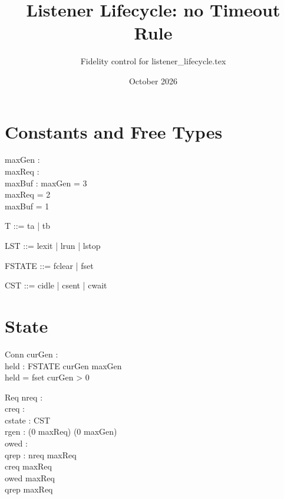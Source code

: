 \documentclass[a4paper,10pt,fleqn]{article}
\begin{document}
\title{Listener Lifecycle: no Timeout Rule}
\author{Fidelity control for listener\_lifecycle.tex}
\date{October 2026}
\maketitle

\section{Constants and Free Types}

\begin{axdef}
  maxGen : \nat \\
  maxReq : \nat \\
  maxBuf : \nat
\where
  maxGen = 3 \\
  maxReq = 2 \\
  maxBuf = 1
\end{axdef}

\begin{zed}
  T ::= ta | tb
\end{zed}

\begin{zed}
  LST ::= lexit | lrun | lstop
\end{zed}

\begin{zed}
  FSTATE ::= fclear | fset
\end{zed}

\begin{zed}
  CST ::= cidle | csent | cwait
\end{zed}

\section{State}

\begin{schema}{Conn}
  curGen : \nat \\
  held : FSTATE
\where
  curGen \leq maxGen \\
  held = fset \implies curGen > 0
\end{schema}

\begin{schema}{Req}
  nreq : \nat \\
  creq : \nat \\
  cstate : CST \\
  rgen : (0 \upto maxReq) \fun (0 \upto maxGen) \\
  owed : \power \nat \\
  qrep : \power \nat
\where
  nreq \leq maxReq \\
  creq \leq maxReq \\
  owed  \upto maxReq \\
  qrep  \upto maxReq
\end{schema}
\end{document}

